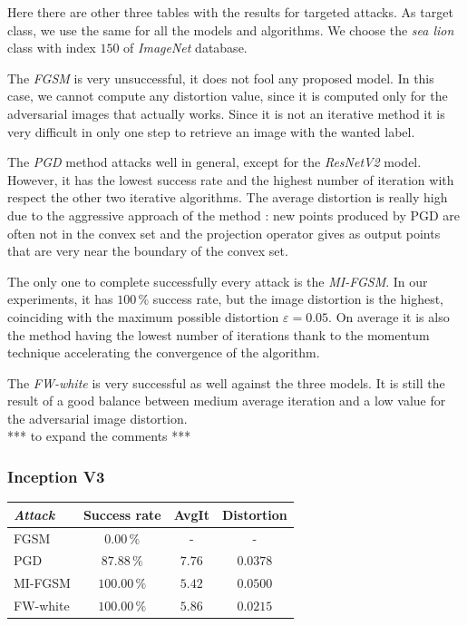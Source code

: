 \documentclass[10pt,twocolumn,letterpaper, english]{article}
\theoremstyle{definition}
\theoremstyle{plain}
\theoremstyle{plain}
\theoremstyle{plain}
\theoremstyle{plain}
\theoremstyle{remark}
\theoremstyle{remark}
\theoremstyle{definition}
\theoremstyle{definition}
\theoremstyle{definition}
\theoremstyle{definition}
\renewcommand{\epsilon}{\varepsilon}
\begin{document}

Here there are other three tables with the results for targeted attacks. 
As target class, we use the same for all the models and algorithms. 
We choose the \textit{sea lion} class with index $150$ of \textit{ImageNet} database. 

The \textit{FGSM} is very unsuccessful, it does not fool any proposed model. 
In this case, we cannot compute any distortion value, since it is computed only for the adversarial images that actually works. Since it is not an iterative method it is very difficult in only one step
to retrieve an image with the wanted label.

The \textit{PGD} method attacks well in general, except for the \textit{ResNetV2} model. 
However, it has the lowest success rate and the highest number of iteration with respect the other two iterative algorithms. The average distortion is really high due to the aggressive approach of the method : new points produced by PGD are often not in the convex set and the projection operator gives as output points that are very near the boundary of the convex set.

The only one to complete successfully every attack is the \textit{MI-FGSM}. 
In our experiments, it has $100\,\%$ success rate, but the image distortion is the highest, coinciding with the maximum possible distortion $\epsilon = 0.05$. On average it is also the method having the lowest number of iterations thank to the momentum technique accelerating the convergence of the algorithm.

The \textit{FW-white} is very successful as well against the three models. 
It is still the result of a good balance between medium average iteration and a low value for the adversarial image distortion. \\

*** to expand the comments *** 

\subsubsection{Inception V3}

\begin{center}
    

\begin{tabular}{ |l|c|c|c| }
 \hline
  \textit{Attack} & Success rate & AvgIt & Distortion \\
 \hline
 
 FGSM   & $0.00\,\%$   &  - & -\\
 PGD&   $87.88\,\%$  & $7.76$  & $0.0378$ \\
 MI-FGSM & $100.00\,\%$ & $5.42$ & $0.0500$\\
 FW-white & $100.00\,\%$ & $5.86$ & $0.0215$\\
\hline
\end{tabular}
\end{center}
\end{document}
